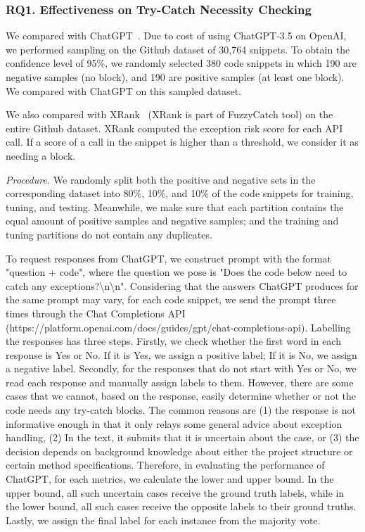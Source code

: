 \subsubsection{RQ1. Effectiveness on Try-Catch Necessity Checking}

 We compared {\xblock} with
ChatGPT~\cite{tien}. Due to cost of using ChatGPT-3.5 on OpenAI, we performed
sampling on the Github dataset of 30,764 snippets. To obtain the
confidence level of 95\%, we randomly selected 380 code snippets in
which 190 are negative samples (no  block), and 190
are positive samples (at least one  block). We
compared with ChatGPT on this sampled dataset. 

We also compared {\xblock} with XRank~\cite{xrank-fse20} (XRank is
part of FuzzyCatch tool) on the entire Github dataset. XRank computed
the exception risk score for each API call. If a score of a call in
the snippet is higher than a threshold, we consider it as needing a
 block.

{\em Procedure.} We randomly split both the positive and negative sets
in the corresponding dataset into 80\%, 10\%, and 10\% of the code
snippets for training, tuning, and testing. Meanwhile, we make sure
that each partition contains the equal amount of positive samples and
negative samples; and the training and tuning partitions do not
contain any duplicates. 

To request responses from ChatGPT, we construct prompt with the format "question + code", where the question we pose is "Does the code below need to catch any exceptions?\textbackslash n\textbackslash n". 
Considering that the answers ChatGPT produces for the same prompt may vary, for each code snippet, we send the prompt three times through the Chat Completions API
(https://platform.openai.com/docs/guides/gpt/chat-completions-api). Labelling the responses has three steps. Firstly, we check whether the first word in 
each response is Yes or No. If it is Yes, we assign a positive label; If it is No, we assign a negative label. Secondly, for the responses that do not start with Yes or No, we read each response and manually assign labels to them. 
However, there are some cases that we cannot, based on the response, easily determine whether or not the code needs any try-catch blocks. The common reasons are (1) the response is not informative enough in that it only relays some general advice about exception handling,
(2) In the text, it submits that it is uncertain about the case, or (3) the decision depends on background knowledge about either the project structure or certain method specifications. 
Therefore, in evaluating the performance of ChatGPT, for each metrics, we calculate the lower and upper bound. In the upper bound, all such uncertain cases receive the ground truth labels, while in the lower bound, all such cases receive the opposite labels to their ground truths. Lastly, we assign the final label for each instance from the majority vote.

